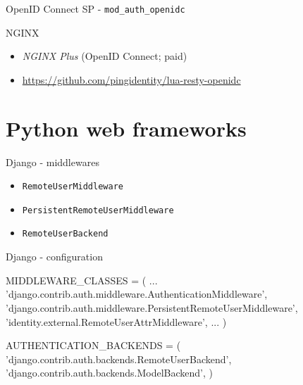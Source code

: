 \documentclass[ignorenonframetext,aspectratio=169]{beamer}
\newenvironment{Shaded}{}{}
\newcommand{\StringTok}[1]{\textcolor[rgb]{0.25,0.44,0.63}{{#1}}}
\newcommand{\OperatorTok}[1]{\textcolor[rgb]{0.40,0.40,0.40}{{#1}}}
\newcommand{\NormalTok}[1]{{#1}}
\providecommand{\tightlist}{%
  \setlength{\itemsep}{0pt}\setlength{\parskip}{0pt}}
\begin{document}
\begin{frame}[fragile]{OpenID Connect SP - \tt mod\_auth\_openidc}
\end{frame}

\begin{frame}[fragile]{NGINX}
\begin{itemize}
\tightlist
\item {\em NGINX Plus} (OpenID Connect; paid)
\item \url{https://github.com/pingidentity/lua-resty-openidc}
\end{itemize}
\end{frame}

\section{Python web frameworks}

\begin{frame}{Django - middlewares}
\begin{itemize}
\tightlist

\item {\tt RemoteUserMiddleware}
\item {\tt PersistentRemoteUserMiddleware}
\item {\tt RemoteUserBackend}

\end{itemize}
\end{frame}

\begin{frame}[fragile]{Django - configuration}
\begin{Shaded}
\begin{Highlighting}[]
\NormalTok{MIDDLEWARE_CLASSES }\OperatorTok{=} \NormalTok{(}
 \NormalTok{...}
 \StringTok{'django.contrib.auth.middleware.AuthenticationMiddleware'}\NormalTok{,}
 \StringTok{'django.contrib.auth.middleware.PersistentRemoteUserMiddleware'}\NormalTok{,}
 \StringTok{'identity.external.RemoteUserAttrMiddleware'}\NormalTok{,}
 \NormalTok{...}
\NormalTok{)}

\NormalTok{AUTHENTICATION_BACKENDS }\OperatorTok{=} \NormalTok{(}
  \StringTok{'django.contrib.auth.backends.RemoteUserBackend'}\NormalTok{,}
  \StringTok{'django.contrib.auth.backends.ModelBackend'}\NormalTok{,}
\NormalTok{)}
\end{Highlighting}
\end{Shaded}
\end{frame}
\end{document}
